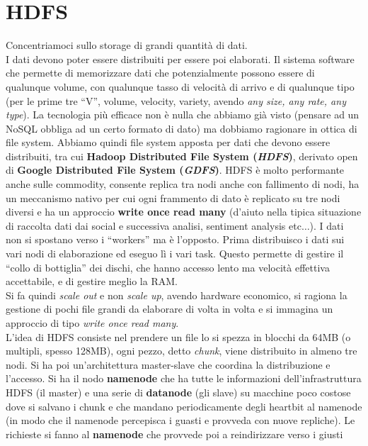 \documentclass[a4paper,12pt, oneside]{book}
\begin{document}
\section{HDFS}
Concentriamoci sullo storage di grandi quantità di dati.\\
I dati devono poter essere distribuiti per essere poi elaborati. Il sistema
software che permette di memorizzare dati che potenzialmente possono essere di
qualunque volume, con qualunque tasso di velocità di arrivo e di qualunque tipo
(per le prime tre ``V'', volume, velocity, variety, avendo \textit{any size, any
  rate, any type}). La tecnologia più efficace non è nulla che abbiamo già visto
(pensare ad un NoSQL obbliga ad un certo formato di dato) ma dobbiamo ragionare
in ottica di file system. Abbiamo quindi file system apposta per dati che
devono essere distribuiti, tra cui \textbf{Hadoop Distributed File System
  (\textit{HDFS})}, derivato open di \textbf{Google Distributed File System
  (\textit{GDFS})}. HDFS è molto performante anche sulle commodity, consente
replica tra nodi anche con fallimento di nodi, ha un meccanismo nativo per cui
ogni frammento di dato è replicato su tre nodi diversi e ha un approccio
\textbf{write once read many} (d'aiuto nella tipica situazione di raccolta dati
dai social e successiva analisi, sentiment analysis etc$\ldots$). I dati non si
spostano verso i ``workers'' ma 
è l'opposto. Prima distribuisco i dati sui vari nodi di elaborazione ed eseguo
lì i vari task. Questo permette di gestire il ``collo di bottiglia'' dei dischi,
che hanno accesso lento ma velocità effettiva accettabile, e di gestire meglio
la RAM.\\
Si fa quindi \textit{scale out} e non \textit{scale up}, avendo hardware
economico, si ragiona la gestione di pochi file grandi da elaborare di volta in
volta e si immagina un approccio di tipo \textit{write once read many}.\\
L'idea di HDFS consiste nel prendere un file lo si spezza in blocchi da 64MB (o
multipli, spesso 128MB), ogni pezzo, detto \textit{chunk}, viene distribuito in
almeno tre 
nodi. Si ha poi un'architettura master-slave che coordina la distribuzione e
l'accesso. Si ha il nodo \textbf{namenode} che ha tutte le informazioni
dell'infrastruttura HDFS (il master) e una serie di \textbf{datanode} (gli
slave) su macchine poco costose dove si salvano i chunk e che mandano
periodicamente degli heartbit al namenode (in modo che il namenode percepisca i
guasti e provveda con nuove repliche). Le richieste si fanno
al \textbf{namenode} che provvede poi a reindirizzare verso i giusti
\end{document}
